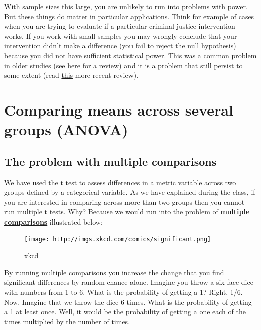 \documentclass[
]{book}
\begin{document}
With sample sizes this large, you are unlikely to run into problems with power. But these things do matter in particular applications. Think for example of cases when you are trying to evaluate if a particular criminal justice intervention works. If you work with small samples you may wrongly conclude that your intervention didn't make a difference (you fail to reject the null hypothesis) because you did not have sufficient statistical power. This was a common problem in older studies (see \href{https://www.sciencedirect.com/science/article/pii/0047235289900044}{here} for a review) and it is a problem that still persist to some extent (read \href{https://www.tandfonline.com/doi/abs/10.1080/07418825.2018.1495252}{this} more recent review).

\hypertarget{comparing-means-across-several-groups-anova}{%
\section{Comparing means across several groups (ANOVA)}\label{comparing-means-across-several-groups-anova}}

\hypertarget{the-problem-with-multiple-comparisons}{%
\subsection{The problem with multiple comparisons}\label{the-problem-with-multiple-comparisons}}

We have used the t test to assess differences in a metric variable across two groups defined by a categorical variable. As we have explained during the class, if you are interested in comparing across more than two groups then you cannot run multiple t tests. Why? Because we would run into the problem of \href{http://en.wikipedia.org/wiki/Multiple_comparisons_problem}{\textbf{multiple comparisons}} illustrated below:

\begin{figure}
\centering
\texttt{[image: http://imgs.xkcd.com/comics/significant.png]}
\caption{xkcd}
\end{figure}

By running multiple comparisons you increase the change that you find significant differences by random chance alone. Imagine you throw a six face dice with numbers from 1 to 6. What is the probability of getting a 1? Right, 1/6. Now. Imagine that we throw the dice 6 times. What is the probability of getting a 1 at least once. Well, it would be the probability of getting a one each of the times multiplied by the number of times.
\end{document}
